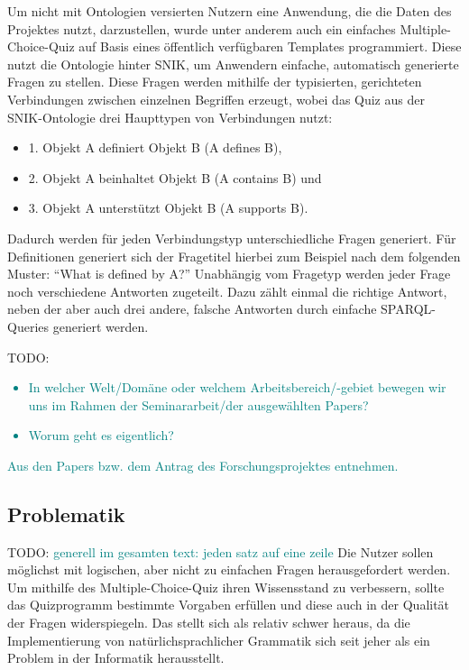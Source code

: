 \documentclass[headsepline,titlepage,ngerman,twoside,12pt]{report}
\newcommand\todo[1]{TODO: \textcolor{teal}{#1}}
\begin{document}
Um nicht mit Ontologien versierten Nutzern eine Anwendung, die die Daten des Projektes nutzt, darzustellen, wurde unter anderem auch ein einfaches Multiple-Choice-Quiz auf Basis eines öffentlich verfügbaren Templates programmiert.
Diese nutzt die Ontologie hinter SNIK, um Anwendern einfache, automatisch generierte Fragen zu stellen.
Diese Fragen werden mithilfe der typisierten, gerichteten Verbindungen zwischen einzelnen Begriffen erzeugt, wobei das Quiz aus der SNIK-Ontologie drei Haupttypen von Verbindungen nutzt:
\begin{itemize}
    \item 1. Objekt A definiert Objekt B (A defines B),
    \item 2. Objekt A beinhaltet Objekt B (A contains B) und
    \item 3. Objekt A unterstützt Objekt B (A supports B).
\end{itemize}
Dadurch werden für jeden Verbindungstyp unterschiedliche Fragen generiert.
Für Definitionen generiert sich der Fragetitel hierbei zum Beispiel nach dem folgenden Muster:
\newline \enquote{What is defined by A?}\newline
Unabhängig vom Fragetyp werden jeder Frage noch verschiedene Antworten zugeteilt.
Dazu zählt einmal die richtige Antwort, neben der aber auch drei andere, falsche Antworten durch einfache SPARQL-Queries generiert werden. 

\todo{
\begin{itemize}
\item In welcher Welt/Domäne oder welchem Arbeitsbereich/-gebiet bewegen wir uns im Rahmen der Seminararbeit/der ausgewählten Papers?
\item Worum geht es eigentlich?
\end{itemize}
Aus den Papers bzw. dem Antrag des Forschungsprojektes entnehmen.
}

\subsection{Problematik}
\label{sub:Problematik}
\todo{generell im gesamten text: jeden satz auf eine zeile}
Die Nutzer sollen möglichst mit logischen, aber nicht zu einfachen Fragen herausgefordert werden.
Um mithilfe des Multiple-Choice-Quiz ihren Wissensstand zu verbessern, sollte das Quizprogramm bestimmte Vorgaben erfüllen und diese auch in der Qualität der Fragen widerspiegeln.
Das stellt sich als relativ schwer heraus, da die Implementierung von natürlichsprachlicher Grammatik sich seit jeher als ein Problem in der Informatik herausstellt.
\end{document}
